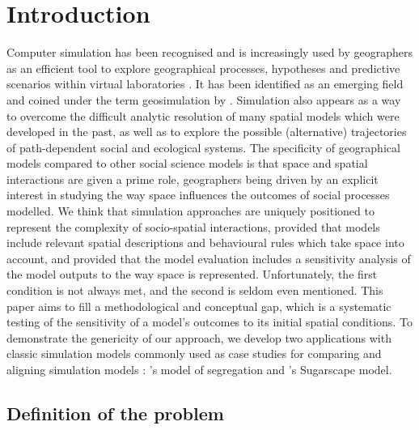\documentclass{JASSS}
\begin{document}
\section{Introduction}

Computer simulation has been recognised and is increasingly used by geographers as an efficient tool to explore geographical processes, hypotheses and predictive scenarios within virtual laboratories \citep{batty1971modelling, batty2007model, carley1999generating, Quesneletal2009}. It has been identified as an emerging field and coined under the term geosimulation by \cite{benenson2004geosimulation}. Simulation also appears as a way to overcome the difficult analytic resolution of many spatial models which were developed in the past, as well as to explore the possible (alternative) trajectories of path-dependent social and ecological systems. The specificity of geographical models compared to other social science models is that space and spatial interactions are given a prime role, geographers being driven by an explicit interest in studying the way space influences the outcomes of social processes modelled. We think that simulation approaches are uniquely positioned to represent the complexity of socio-spatial interactions, provided that models include relevant spatial descriptions and behavioural rules which take space into account, and provided that the model evaluation includes a sensitivity analysis of the model outputs to the way space is represented. Unfortunately, the first condition is not always met, and the second is seldom even mentioned. This paper aims to fill a methodological and conceptual gap, which is a systematic testing of the sensitivity of a model's outcomes to its initial spatial conditions. To demonstrate the genericity of our approach, we develop two applications with classic simulation models commonly used as case studies for comparing and aligning simulation models \citep{Axtelletal1996, wilensky2007making}: \citet{schelling1971dynamic}'s model of segregation and \citet{EpsteinAxtell1996}'s Sugarscape model.\\

\subsection{Definition of the problem}
\end{document}

